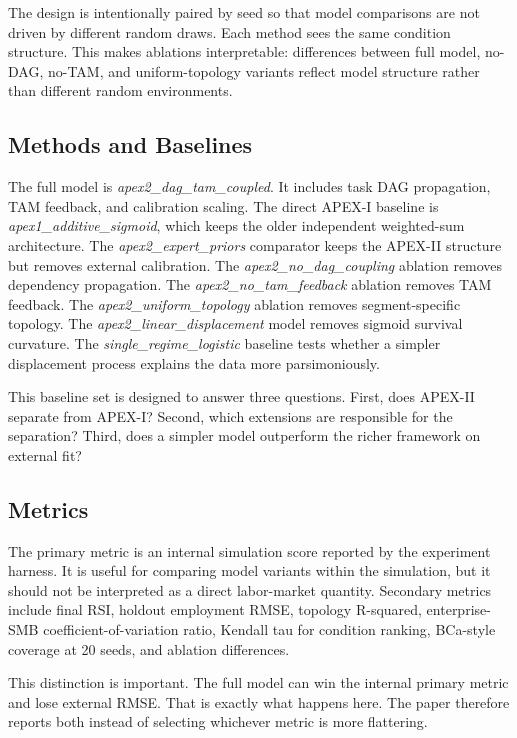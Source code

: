 \documentclass[10pt,conference]{IEEEtran}
\begin{document}
The design is intentionally paired by seed so that model comparisons are not driven by different random draws. Each method sees the same condition structure. This makes ablations interpretable: differences between full model, no-DAG, no-TAM, and uniform-topology variants reflect model structure rather than different random environments.

\subsection{Methods and Baselines}
The full model is \emph{apex2\_dag\_tam\_coupled}. It includes task DAG propagation, TAM feedback, and calibration scaling. The direct APEX-I baseline is \emph{apex1\_additive\_sigmoid}, which keeps the older independent weighted-sum architecture. The \emph{apex2\_expert\_priors} comparator keeps the APEX-II structure but removes external calibration. The \emph{apex2\_no\_dag\_coupling} ablation removes dependency propagation. The \emph{apex2\_no\_tam\_feedback} ablation removes TAM feedback. The \emph{apex2\_uniform\_topology} ablation removes segment-specific topology. The \emph{apex2\_linear\_displacement} model removes sigmoid survival curvature. The \emph{single\_regime\_logistic} baseline tests whether a simpler displacement process explains the data more parsimoniously.

This baseline set is designed to answer three questions. First, does APEX-II separate from APEX-I? Second, which extensions are responsible for the separation? Third, does a simpler model outperform the richer framework on external fit?

\subsection{Metrics}
The primary metric is an internal simulation score reported by the experiment harness. It is useful for comparing model variants within the simulation, but it should not be interpreted as a direct labor-market quantity. Secondary metrics include final RSI, holdout employment RMSE, topology R-squared, enterprise-SMB coefficient-of-variation ratio, Kendall tau for condition ranking, BCa-style coverage at 20 seeds, and ablation differences.

This distinction is important. The full model can win the internal primary metric and lose external RMSE. That is exactly what happens here. The paper therefore reports both instead of selecting whichever metric is more flattering.
\end{document}
